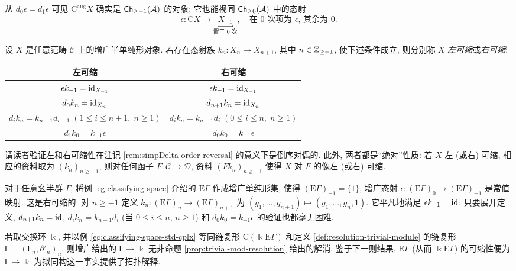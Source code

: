 从 $d_0 \epsilon = d_1 \epsilon$ 可见 $\mathrm{C}^{\mathrm{aug}} X$ 确实是 $\mathsf{Ch}_{\geq -1}(\mathcal{A})$ 的对象; 它也能视同 $\mathsf{Ch}_{\geq 0}(\mathcal{A})$ 中的态射
\[ \epsilon: \mathrm{C} X \to \underbracket{X_{-1}}_{\text{置于 $0$ 次}}, \quad \text{在 $0$ 次项为 $\epsilon$, 其余为 $0$.} \]

\begin{definition}\label{def:contractible-aug}
	设 $X$ 是任意范畴 $\mathcal{C}$ 上的增广半单纯形对象. 若存在态射族 $k_n: X_n \to X_{n+1}$, 其中 $n \in \mathbb{Z}_{\geq -1}$, 使下述条件成立, 则分别称 $X$ \emph{左可缩}或\emph{右可缩}:
	\begin{center}\begin{tabular}{|c|c|} \hline
		左可缩 & 右可缩 \\ \hline
		$\epsilon k_{-1} = \mathrm{id}_{X_{-1}}$ & $\epsilon k_{-1} = \mathrm{id}_{X_{-1}}$ \\
		$d_0 k_n = \mathrm{id}_{X_n}$ & $d_{n+1} k_n = \mathrm{id}_{X_n}$ \\
		$d_i k_n = k_{n-1} d_{i-1}\; \left(1 \leq i \leq n+1, \; n \geq 1\right)$ & $d_i k_n = k_{n-1} d_i \; \left(0 \leq i \leq n, \; n \geq 1 \right)$ \\
		$d_1 k_0 = k_{-1} \epsilon$ & $d_0 k_0 = k_{-1} \epsilon$ \\ \hline
	\end{tabular}\end{center}
\end{definition}

请读者验证左和右可缩性在注记 \ref{rem:simpDelta-order-reversal} 的意义下是倒序对偶的. 此外, 两者都是``绝对''性质: 若 $X$ 左 (或右) 可缩, 相应的资料取为 $(k_n)_{n \geq -1}$, 则对任何函子 $F: \mathcal{C} \to \mathcal{D}$, 资料 $(Fk_n)_{n \geq -1}$ 使得 $X$ 对 $F$ 的像左 (或右) 可缩.

\begin{example}\label{eg:classifying-contractible}
	对于任意幺半群 $\Gamma$, 将例 \ref{eg:classifying-space} 介绍的 $\mathrm{E}\Gamma$ 作成增广单纯形集, 使得 $(\mathrm{E}\Gamma)_{-1} = \{1\}$, 增广态射 $\epsilon: (\mathrm{E}\Gamma)_0 \to (\mathrm{E}\Gamma)_{-1}$ 是常值映射. 这是右可缩的: 对 $n \geq -1$ 定义 $k_n: (\mathrm{E}\Gamma)_n \to (\mathrm{E}\Gamma)_{n+1}$ 为 $(g_1, \ldots, g_{n+1}) \mapsto (g_1, \ldots, g_n, 1)$. 它平凡地满足 $\epsilon k_{-1} = \mathrm{id}$; 只要展开定义, $d_{n+1} k_n = \mathrm{id}$, $d_i k_n = k_{n-1} d_i$ (当 $0 \leq i \leq n$, $n \geq 1$) 和 $d_0 k_0 = k_{-1} \epsilon$ 的验证也都毫无困难.
	
	若取交换环 $\Bbbk$, 并以例 \ref{eg:classifying-space-std-cplx} 等同链复形 $\mathrm{C}(\Bbbk\mathrm{E}\Gamma)$ 和定义 \ref{def:resolution-trivial-module} 的链复形 $\mathsf{L} = (\mathsf{L}_n, \partial'_n)_n$, 则增广给出的 $\mathsf{L} \to \Bbbk$ 无非命题 \ref{prop:trivial-mod-resolution} 给出的解消. 鉴于下一则结果, $\mathrm{E}\Gamma$ (从而 $\Bbbk\mathrm{E}\Gamma$) 的可缩性便为 $\mathsf{L} \to \Bbbk$ 为拟同构这一事实提供了拓扑解释.
\end{example}

